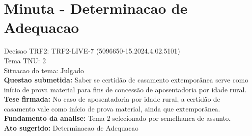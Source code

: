 \documentclass{article}
\begin{document}
\section*{Minuta - Determinacao de Adequacao}
Decisao TRF2: TRF2-LIVE-7 (5096650-15.2024.4.02.5101)\\
Tema TNU: 2\\
Situacao do tema: Julgado\\
\textbf{Questao submetida:} Saber se certidão de casamento extemporânea serve como início de prova material para fins de concessão de aposentadoria por idade rural.\\
\textbf{Tese firmada:} No caso de aposentadoria por idade rural, a certidão de casamento vale como início de prova material, ainda que extemporânea.\\
\textbf{Fundamento da analise:} Tema 2 selecionado por semelhanca de assunto.\\
\textbf{Ato sugerido:} Determinacao de Adequacao
\end{document}

